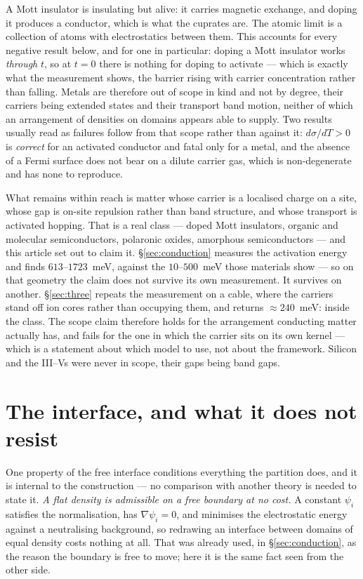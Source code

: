 \documentclass[11pt]{article}
\newcommand{\grad}{\nabla}
\begin{document}
\noindent A Mott insulator is insulating but alive: it carries magnetic exchange, and doping it
produces a conductor, which is what the cuprates are. The atomic limit is a collection of atoms with
electrostatics between them. This accounts for every negative result below, and for one in
particular: doping a Mott insulator works \emph{through} $t$, so at $t=0$ there is nothing for
doping to activate --- which is exactly what the measurement shows, the barrier rising with carrier
concentration rather than falling. Metals are therefore out of scope in kind and not by degree, their carriers being extended states
and their transport band motion, neither of which an arrangement of densities on domains appears
able to supply. Two results usually read as failures follow from that scope rather than against it: $d\sigma/dT>0$ is \emph{correct} for an
activated conductor and fatal only for a metal, and the absence of a Fermi surface does not bear on
a dilute carrier gas, which is non-degenerate and has none to reproduce.

What remains within reach is matter whose carrier is a localised charge on a site, whose gap is
on-site repulsion rather than band structure, and whose transport is activated hopping. That is a
real class --- doped Mott insulators, organic and molecular semiconductors, polaronic oxides,
amorphous semiconductors --- and this article set out to claim it. \S\ref{sec:conduction} measures
the activation energy and finds $613$--$1723$~meV, against the $10$--$500$~meV those materials
show --- so on that geometry the claim does not survive its own measurement. It survives on another.
\S\ref{sec:three} repeats the measurement on a cable, where the carriers stand off ion cores rather
than occupying them, and returns ${\approx}240$~meV: inside the class. The scope claim therefore
holds for the arrangement conducting matter actually has, and fails for the one in which the carrier
sits on its own kernel --- which is a statement about which model to use, not about the framework. Silicon and the III--Vs were never in
scope, their gaps being band gaps.

\section{The interface, and what it does not resist}\label{sec:coefficient}

One property of the free interface conditions everything the partition does, and it is internal to
the construction --- no comparison with another theory is needed to state it. \emph{A flat density is
admissible on a free boundary at no cost.} A constant $\psi_i$ satisfies the normalisation, has
$\grad\psi_i=0$, and minimises the electrostatic energy against a neutralising background, so
redrawing an interface between domains of equal density costs nothing at all. That was already used,
in \S\ref{sec:conduction}, as the reason the boundary is free to move; here it is the same fact seen
from the other side.
\end{document}
